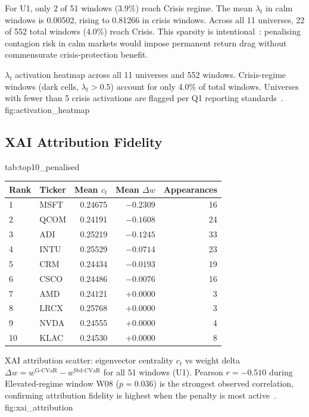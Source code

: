 For U1, only 2 of 51 windows (3.9\%) reach Crisis regime. The mean
$\lambda_t$ in calm windows is 0.00502, rising to 0.81266 in crisis
windows. Across all 11 universes, 22 of 552 total windows (4.0\%) reach
Crisis. This sparsity is intentional~\citep{ang2002,hamilton1989}:
penalising contagion risk in calm markets would impose permanent return
drag without commensurate crisis-protection benefit.

  {$\lambda_t$ activation heatmap across all 11 universes and 552
   windows. Crisis-regime windows (dark cells, $\lambda_t > 0.5$)
   account for only 4.0\% of total windows. Universes with fewer
   than 5 crisis activations are flagged per Q1 reporting
   standards~\citep{harvey2016}.}
  {fig:activation_heatmap}

\subsection{XAI Attribution Fidelity}

  {tab:top10_penalised}
  {\begin{tabular}{llrrr}
  \toprule
  Rank & Ticker & Mean $c_t$ & Mean $\Delta w$ & Appearances \\
  \midrule
  1  & MSFT & 0.24675 & $-0.2309$ & 16 \\
  2  & QCOM & 0.24191 & $-0.1608$ & 24 \\
  3  & ADI  & 0.25219 & $-0.1245$ & 33 \\
  4  & INTU & 0.25529 & $-0.0714$ & 23 \\
  5  & CRM  & 0.24434 & $-0.0193$ & 19 \\
  6  & CSCO & 0.24486 & $-0.0076$ & 16 \\
  7  & AMD  & 0.24121 & $+0.0000$ & 3  \\
  8  & LRCX & 0.25768 & $+0.0000$ & 3  \\
  9  & NVDA & 0.24555 & $+0.0000$ & 4  \\
  10 & KLAC & 0.24530 & $+0.0000$ & 8  \\
  \bottomrule
  \end{tabular}}

  {XAI attribution scatter: eigenvector centrality $c_t$ vs weight
   delta $\Delta w = w^{\text{G-CVaR}} - w^{\text{Std-CVaR}}$ for
   all 51 windows (U1). Pearson $r = -0.510$ during Elevated-regime
   window W08 ($p = 0.036$) is the strongest observed correlation,
   confirming attribution fidelity is highest when the penalty is
   most active~\citep{bonacich1987,arrieta2020}.}
  {fig:xai_attribution}

